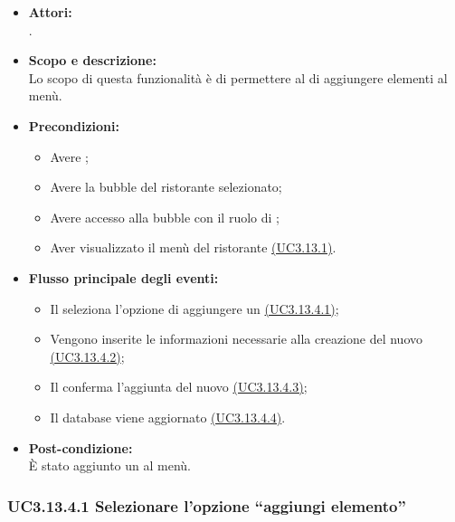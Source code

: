 \begin{itemize}
	\item \textbf{Attori:}
	\\.
	\item \textbf{Scopo e descrizione:} 
	\\Lo scopo di questa funzionalità è di permettere al  di aggiungere elementi al menù.
	\item \textbf{Precondizioni:}
	\begin{itemize}
		\item Avere ;
		\item Avere la bubble del ristorante selezionato;
		\item Avere accesso alla bubble con il ruolo di ;
		\item Aver visualizzato il menù del ristorante \hyperref[UC3.13.1]{(UC3.13.1)}.
	\end{itemize}
	\item \textbf{Flusso principale degli eventi:}
	\begin{itemize}
		\item Il  seleziona l’opzione di aggiungere un  \hyperref[UC3.13.4.1]{(UC3.13.4.1)};
		\item Vengono inserite le informazioni necessarie alla creazione del nuovo  \hyperref[UC3.13.4.2]{(UC3.13.4.2)};
		\item Il  conferma l’aggiunta del nuovo  \hyperref[UC3.13.4.3]{(UC3.13.4.3)};
		\item Il database viene aggiornato \hyperref[UC3.13.4.4]{(UC3.13.4.4)}.
	\end{itemize}
	\item \textbf{Post-condizione:}
	\\È stato aggiunto un  al menù.
\end{itemize}

\subsubsection{UC3.13.4.1 Selezionare l’opzione “aggiungi elemento”} \label{UC3.13.4.1}

